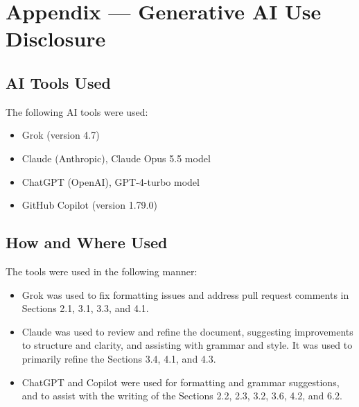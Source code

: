 \documentclass[12pt, titlepage]{article}
\begin{document}
\newpage{}

\section{Appendix --- Generative AI Use Disclosure}


\subsection{AI Tools Used}


The following AI tools were used:
\begin{itemize}
    \item Grok (version 4.7)
    \item Claude (Anthropic), Claude Opus 5.5 model
    \item ChatGPT (OpenAI), GPT-4-turbo model
    \item GitHub Copilot (version 1.79.0)
\end{itemize}

\subsection{How and Where Used}




The tools were used in the following manner:
\begin{itemize}
    \item Grok was used to fix formatting issues and address pull request comments
    in Sections 2.1, 3.1, 3.3, and 4.1.
    \item Claude was used to review and refine the document, suggesting
    improvements to structure and clarity, and assisting with grammar and style. It
    was used to primarily refine the Sections 3.4, 4.1, and 4.3.
    \item ChatGPT and Copilot were used for formatting and grammar suggestions, and
    to assist with the writing of the Sections 2.2, 2.3, 3.2, 3.6, 4.2, and 6.2.
\end{itemize}
\end{document}
